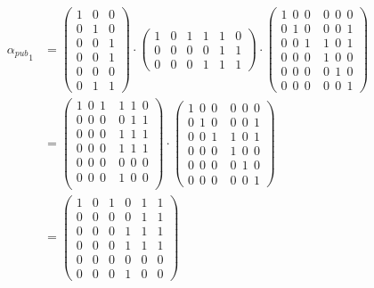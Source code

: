 \begin{equation}\label{eq:ej-alpha-pub-1}
	\begin{aligned}
	{{\alpha_{pub}}_1}  & =  
	\begin{pmatrix}
		1 & 0 & 0\\
		0 & 1 & 0\\
		0 & 0 & 1\\
		\hline
		0 & 0 & 1\\
		0 & 0 & 0\\
		0 & 1 & 1
	\end{pmatrix}
	\cdot
	\begin{pmatrix}
		1 & 0 & 1 & 1 & 1 & 0\\
		0 & 0 & 0 & 0 & 1 & 1\\
		0 & 0 & 0 & 1 & 1 & 1
	\end{pmatrix}
	\cdot
	\left(\begin{array}{c|c}
		1\ \ 0\ \ 0\ & 0\ \ 0\ \ 0\\
		0\ \ 1\ \ 0\ & 0\ \ 0\ \ 1\\
		0\ \ 0\ \ 1\ & 1\ \ 0\ \ 1\\
		\hline
		0\ \ 0\ \ 0\ & 1\ \ 0\ \ 0\\
		0\ \ 0\ \ 0\ & 0\ \ 1\ \ 0\\
		0\ \ 0\ \ 0\ & 0\ \ 0\ \ 1
	\end{array}\right) \\
	& = \left(\begin{array}{c|c}
		1\ \ 0\ \ 1\ & 1\ \ 1\ \ 0\\
		0\ \ 0\ \ 0\ & 0\ \ 1\ \ 1\\
		0\ \ 0\ \ 0\ & 1\ \ 1\ \ 1\\
		\hline
		0\ \ 0\ \ 0\ & 1\ \ 1\ \ 1\\
		0\ \ 0\ \ 0\ & 0\ \ 0\ \ 0\\
		0\ \ 0\ \ 0\ & 1\ \ 0\ \ 0\\
	\end{array}\right)
	\cdot
	\left(\begin{array}{c|c}
		1\ \ 0\ \ 0\ & 0\ \ 0\ \ 0\\
		0\ \ 1\ \ 0\ & 0\ \ 0\ \ 1\\
		0\ \ 0\ \ 1\ & 1\ \ 0\ \ 1\\
		\hline
		0\ \ 0\ \ 0\ & 1\ \ 0\ \ 0\\
		0\ \ 0\ \ 0\ & 0\ \ 1\ \ 0\\
		0\ \ 0\ \ 0\ & 0\ \ 0\ \ 1
	\end{array}\right)\\
	& = \begin{pmatrix}
		1 & 0 & 1 & 0 & 1 & 1\\
		0 & 0 & 0 & 0 & 1 & 1\\
		0 & 0 & 0 & 1 & 1 & 1\\
		0 & 0 & 0 & 1 & 1 & 1\\
		0 & 0 & 0 & 0 & 0 & 0\\
		0 & 0 & 0 & 1 & 0 & 0
	\end{pmatrix}
	\end{aligned}
\end{equation}

